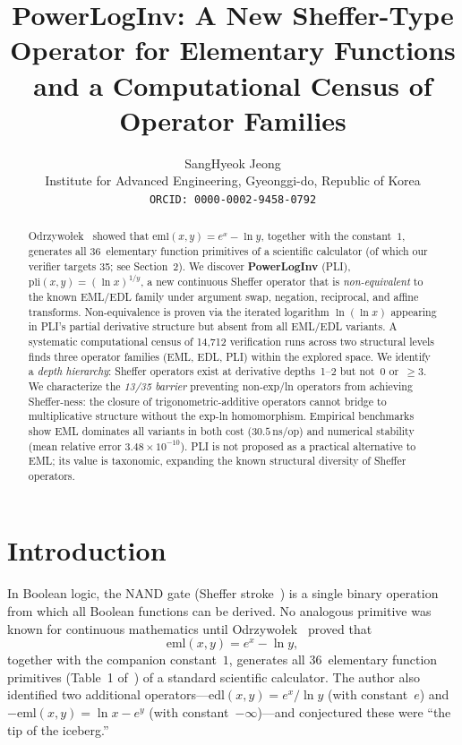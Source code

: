 \documentclass[10pt,twocolumn]{article}
\title{PowerLogInv: A New Sheffer-Type Operator for Elementary Functions\\and a Computational Census of Operator Families}
\author{SangHyeok Jeong\\
Institute for Advanced Engineering, Gyeonggi-do, Republic of Korea\\
\texttt{ORCID: 0000-0002-9458-0792}}
\date{}
\theoremstyle{remark}
\begin{document}
\maketitle

\begin{abstract}
Odrzywołek~\cite{odrzywołek2026} showed that $\mathrm{eml}(x,y) = e^x - \ln y$, together with the constant~$1$, generates all 36~elementary function primitives of a scientific calculator (of which our verifier targets 35; see Section~2). We discover \textbf{PowerLogInv} (PLI), $\mathrm{pli}(x,y) = (\ln x)^{1/y}$, a new continuous Sheffer operator that is \emph{non-equivalent} to the known EML/EDL family under argument swap, negation, reciprocal, and affine transforms. Non-equivalence is proven via the iterated logarithm $\ln(\ln x)$ appearing in PLI's partial derivative structure but absent from all EML/EDL variants. A systematic computational census of 14{,}712 verification runs across two structural levels finds three operator families (EML, EDL, PLI) within the explored space. We identify a \emph{depth hierarchy}: Sheffer operators exist at derivative depths~1--2 but not~0 or~$\geq 3$. We characterize the \emph{13/35 barrier} preventing non-exp/ln operators from achieving Sheffer-ness: the closure of trigonometric-additive operators cannot bridge to multiplicative structure without the exp-ln homomorphism. Empirical benchmarks show EML dominates all variants in both cost ($30.5$\,ns/op) and numerical stability (mean relative error $3.48 \times 10^{-10}$). PLI is not proposed as a practical alternative to EML; its value is taxonomic, expanding the known structural diversity of Sheffer operators.
\end{abstract}

\section{Introduction}

In Boolean logic, the NAND gate (Sheffer stroke~\cite{sheffer1913}) is a single binary operation from which all Boolean functions can be derived. No analogous primitive was known for continuous mathematics until Odrzywołek~\cite{odrzywołek2026} proved that
\begin{equation}\label{eq:eml}
\mathrm{eml}(x,y) = e^x - \ln y,
\end{equation}
together with the companion constant~$1$, generates all 36~elementary function primitives (Table~1 of~\cite{odrzywołek2026}) of a standard scientific calculator. The author also identified two additional operators---$\mathrm{edl}(x,y) = e^x / \ln y$ (with constant~$e$) and $-\mathrm{eml}(x,y) = \ln x - e^y$ (with constant~$-\infty$)---and conjectured these were ``the tip of the iceberg.''
\end{document}
